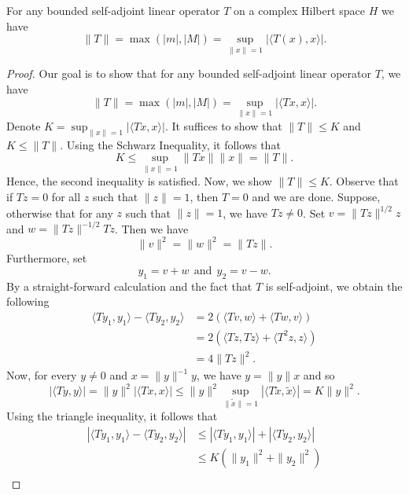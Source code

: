 \begin{theorem}[Norm]
    For any bounded self-adjoint linear operator \( T \) on a complex Hilbert space \( H  \) we have 
    \[  \|T\| = \max(| m | , | M | ) = \sup_{\|x\|=1} | \langle T(x) , x \rangle |.  \]
\end{theorem}

\begin{proof}
Our goal is to show that for any bounded self-adjoint linear operator \( T  \), we have 
\[  \|T\| = \max (| m | , | M | ) = \sup_{\|x\| = 1} | \langle Tx , x \rangle |. \]
Denote \( K = \sup_{\|x\| = 1} | \langle Tx , x \rangle |  \). It suffices to show that \( \|T\| \leq K  \) and \( K \leq \|T\| \). Using the Schwarz Inequality, it follows that
\[  K \leq \sup_{\|x\| =1} \|Tx\| \|x\| = \|T\|. \]
Hence, the second inequality is satisfied. Now, we show \( \|T\| \leq K  \). Observe that if \( Tz = 0  \) for all \( z  \) such that \( \|z\| = 1  \), then \( T  = 0  \) and we are done. Suppose, otherwise that for any \( z  \) such that \( \|z\| = 1  \), we have \( Tz \neq 0  \). Set \( v = \|Tz\|^{1/2} z  \) and \( w = \|Tz\|^{-1/2} Tz  \). Then we have
\[  \|v\|^{2} = \|w\|^{2} = \|Tz\|. \]
Furthermore, set 
\[  {y}_{1} = v + w  \ \ \text{and} \ \ {y}_{2} = v - w. \]
By a straight-forward calculation and the fact that \( T  \) is self-adjoint, we obtain the following 
\begin{align*}
    \langle T {y}_{1} ,  {y}_{1} \rangle - \langle T {y}_{2} ,  {y}_{2} \rangle &= 2 (\langle Tv  , w  \rangle + \langle Tw , v  \rangle) \\
                                                                                &= 2 (\langle Tz  , Tz   \rangle + \langle T^{2} z  ,  z  \rangle) \\ 
                                                                                &= 4 \|Tz\|^{2}.
\end{align*}
Now, for every \( y \neq 0  \) and \( x =  \|y\|^{-1} y  \), we have \( y = \|y\| x  \) and so 
\[  | \langle Ty , y \rangle | = \|y\|^{2} | \langle Tx , x \rangle |  \leq \|y\|^{2} \sup_{\|\tilde{x}\|   = 1} | \langle T \tilde{x} , \tilde{x} \rangle | = K \|y\|^{2}. \]
Using the triangle inequality, it follows that 
\begin{align*}
    | \langle T {y}_{1} , {y}_{1} \rangle - \langle T {y}_{2} , {y}_{2} \rangle | &\leq | \langle T {y}_{1}  ,  {y}_{1} \rangle  |  + | \langle T {y}_{2} ,  {y}_{2} \rangle |  \\
                                                                                  &\leq K (\|{y}_{1}\|^{2} + \|{y}_{2}\|^{2}) \\

\end{align*}
\end{proof}
